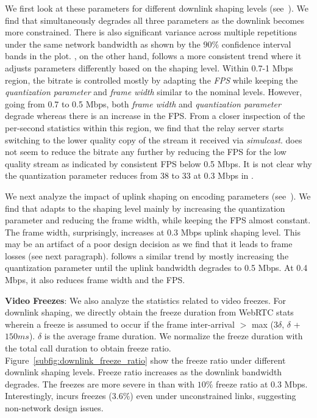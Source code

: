 We first look at these parameters for different downlink shaping levels (see~). We find that \teamsbrowser simultaneously degrades all three parameters as the downlink becomes more constrained. There is also significant variance across multiple repetitions under the same network bandwidth as shown by the $90\%$ confidence interval bands in the plot. \meet, on the other hand, follows a more consistent trend where it adjusts parameters differently based on the shaping level. Within 0.7-1 Mbps region, the bitrate is controlled mostly by adapting the \textit{FPS} while keeping the \textit{quantization parameter} and \textit{frame width} similar to the nominal levels. However, going from 0.7 to 0.5 Mbps, both \textit{frame width} and \textit{quantization parameter} degrade whereas there is an increase in the FPS. From a closer inspection of the per-second statistics within this region, we find that the relay server starts switching to the lower quality copy of the stream it received via \textit{simulcast}. \meet does not seem to reduce the bitrate any further by reducing the FPS for the low quality stream as indicated by consistent FPS below 0.5 Mbps. It is not clear why the quantization parameter reduces from 38 to 33 at 0.3 Mbps in \meet. 

We next analyze the impact of uplink shaping on encoding parameters (see~). We find that \teams adapts to the shaping level mainly by increasing the quantization parameter and reducing the frame width, while keeping the FPS almost constant. The frame width, surprisingly, increases at 0.3 Mbps uplink shaping level. This may be an artifact of a poor design decision as we find that it leads to frame losses (see next paragraph). \meet follows a similar trend by mostly increasing the quantization parameter until the uplink bandwidth degrades to 0.5 Mbps. At 0.4 Mbps, it also reduces frame width and the FPS. 

\textbf{Video Freezes}: We also analyze the statistics related to video freezes. For downlink shaping, we directly obtain the freeze duration from WebRTC stats wherein a freeze is assumed to occur if the frame inter-arrival $>$ max (3$\delta$, $\delta$ + $150 ms$). $\delta$ is the average frame duration. We normalize the freeze duration with the total call duration to obtain freeze ratio.  Figure~\ref{subfig:downlink_freeze_ratio} show the freeze ratio under different downlink shaping levels. Freeze ratio increases as the downlink bandwidth degrades. The freezes are more severe in \meet than \teamsbrowser with $10\%$ freeze ratio at 0.3 Mbps. Interestingly, \teamsbrowser incurs freezes ($3.6\%$) even under unconstrained links, suggesting non-network design issues. 

